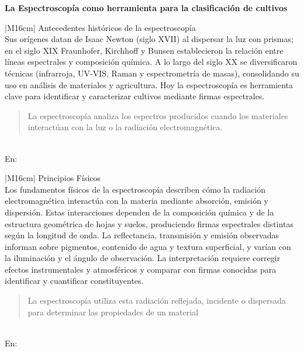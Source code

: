 {\large\textbf{La Espectroscopía como herramienta para la clasificación de cultivos}}
\begin{table}[h!]
  \centering
  \renewcommand{\arraystretch}{2} %
  \begin{tabular}{|M{16cm}|}
    \hline
    Antecedentes históricos de la espectroscopía \\
    \hline
    Sus orígenes datan de Isaac Newton (siglo XVII) al dispersar la luz con prismas; en el siglo XIX Fraunhofer, Kirchhoff y Bunsen establecieron la relación entre líneas espectrales y composición química. 
    A lo largo del siglo XX se diversificaron técnicas (infrarroja, UV‑VIS, Raman y espectrometría de masas), consolidando su uso en análisis de materiales y agricultura. 
    Hoy la espectroscopía es herramienta clave para identificar y caracterizar cultivos mediante firmas espectrales.
    \begin{quote}
    La espectroscopía analiza los espectros producidos cuando los materiales interactúan con la luz o la radiación electromagnética.
    \end{quote}
    \\
    \hline
    En: \cite{Vullaganti2025} \\
    \hline
  \end{tabular}
  \label{tab:argumento1}
\end{table}

\begin{table}[h!]
  \centering
  \renewcommand{\arraystretch}{2} %
  \begin{tabular}{|M{16cm}|}
    \hline
    Principios Físicos \\
    \hline
    Los fundamentos físicos de la espectroscopía describen cómo la radiación electromagnética interactúa con la materia mediante absorción, emisión y dispersión. Estas interacciones dependen de la composición química y de la estructura geométrica de hojas y suelos, produciendo firmas espectrales distintas según la longitud de onda. La reflectancia, transmisión y emisión observadas informan sobre pigmentos, contenido de agua y textura superficial, y varían con la iluminación y el ángulo de observación. La interpretación requiere corregir efectos instrumentales y atmosféricos y comparar con firmas conocidas para identificar y cuantificar constituyentes.
    \begin{quote}
    La espectroscopía utiliza esta radiación reflejada, incidente o dispersada para determinar las propiedades de un material
    \end{quote} \\
    \hline
    En: \cite{Vullaganti2025} \\
    \hline
  \end{tabular}
  \label{tab:argumento1b}
\end{table}


